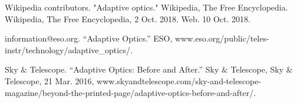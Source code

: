 \documentclass[a4paper,twoside]{article}
\numberwithin{equation}{section}
\begin{document}
\begin{thebibliography}{20}
Wikipedia contributors. "Adaptive optics." Wikipedia, The Free Encyclopedia. Wikipedia, The Free Encyclopedia, 2 Oct. 2018. Web. 10 Oct. 2018.

information@eso.org. “Adaptive Optics.” ESO, www.eso.org/public/teles-instr/technology/adaptive\_optics/. 

Sky $\&$ Telescope. “Adaptive Optics: Before and After.” Sky $\&$ Telescope, Sky $\&$ Telescope, 21 Mar. 2016, www.skyandtelescope.com/sky-and-telescope-magazine/beyond-the-printed-page/adaptive-optics-before-and-after/.

\end{thebibliography}
\end{document}
